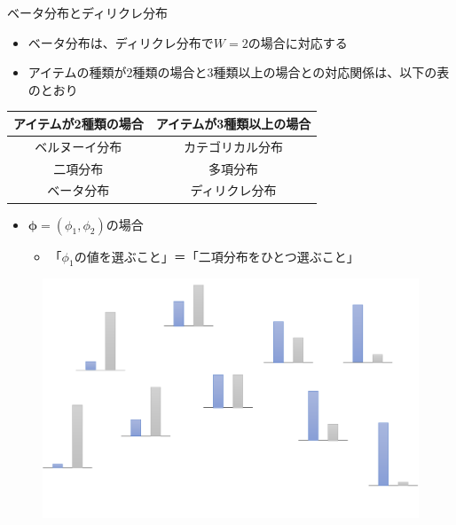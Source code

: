 \documentclass[aspectratio=169,unicode,dvipdfmx,14pt]{beamer}
\begin{document}
\begin{frame}{ベータ分布とディリクレ分布}
\begin{itemize}
\item ベータ分布は、ディリクレ分布で$W=2$の場合に対応する
\item アイテムの種類が2種類の場合と3種類以上の場合との対応関係は、以下の表のとおり
\end{itemize}
\begin{table}
\begin{center}
\begin{tabular}{|c|c|}
\hline アイテムが2種類の場合 & アイテムが3種類以上の場合 \\ \hline
ベルヌーイ分布 & カテゴリカル分布 \\
二項分布 & 多項分布 \\
ベータ分布 & ディリクレ分布 \\ \hline
\end{tabular}
\end{center}
\end{table}
\end{frame}

\begin{frame}
\begin{itemize}
\item $\bm{\phi}=(\phi_1,\phi_2)$の場合
\begin{itemize}
\item 「$\phi_1$の値を選ぶこと」＝「二項分布をひとつ選ぶこと」
\end{itemize}
\end{itemize}
\begin{figure}[htbp]
\begin{center}
\includegraphics[scale=0.15]{beta1.png}
\end{center}
\end{figure}
\end{frame}
\end{document}
